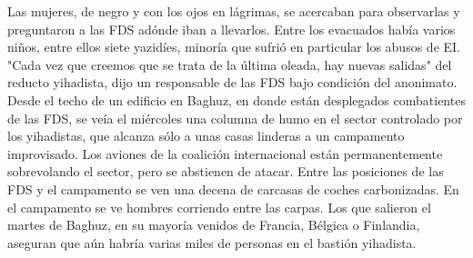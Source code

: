 \documentclass{article}%
\begin{document}
\newline%
%
Las mujeres, de negro y con los ojos en lágrimas, se acercaban para observarlas y preguntaron a las FDS adónde iban a llevarlos.%
\newline%
%
Entre los evacuados había varios niños, entre ellos siete yazidíes, minoría que sufrió en particular los abusos de EI.%
\newline%
%
"Cada vez que creemos que se trata de la última oleada, hay nuevas salidas" del reducto yihadista, dijo un responsable de las FDS bajo condición del anonimato.%
\newline%
%
Desde el techo de un edificio en Baghuz, en donde están desplegados combatientes de las FDS, se veía el miércoles una columna de humo en el sector controlado por los yihadistas, que alcanza sólo a unas casas linderas a un campamento improvisado.%
\newline%
%
Los aviones de la coalición internacional están permanentemente sobrevolando el sector, pero se abstienen de atacar.%
\newline%
%
Entre las posiciones de las FDS y el campamento se ven una decena de carcasas de coches carbonizadas. En el campamento se ve hombres corriendo entre las carpas.%
\newline%
%
Los que salieron el martes de Baghuz, en su mayoría venidos de Francia, Bélgica o Finlandia, aseguran que aún habría varias miles de personas en el bastión yihadista.%
\newline%
%
\end{document}
